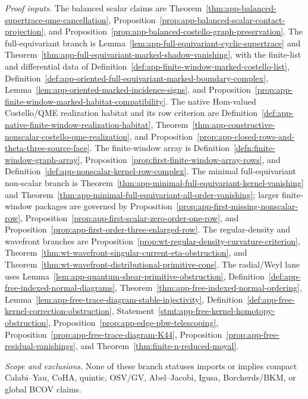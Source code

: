 \begin{stmt}
  \emph{Proof inputs.}
  The balanced scalar claims are
  Theorem~\ref{thm:app-balanced-supertrace-qme-cancellation},
  Proposition~\ref{prop:app-balanced-scalar-contact-projection}, and
  Proposition~\ref{prop:app-balanced-costello-graph-preservation}.  The
  full-equivariant branch is
  Lemma~\ref{lem:app-full-equivariant-cyclic-supertrace} and
  Theorem~\ref{thm:app-full-equivariant-marked-shadow-vanishing}, with
  the finite-list and differential data of
  Definition~\ref{def:app-finite-window-marked-costello-list},
  Definition~\ref{def:app-oriented-full-equivariant-marked-boundary-complex},
  Lemma~\ref{lem:app-oriented-marked-incidence-signs}, and
  Proposition~\ref{prop:app-finite-window-marked-habitat-compatibility}.
  The native Hom-valued Costello/QME realization habitat and its row
  criterion are
  Definition~\ref{def:app-native-finite-window-realization-habitat},
  Theorem~\ref{thm:app-constructive-nonscalar-costello-qme-realization},
  and Proposition~\ref{prop:app-closed-rows-and-theta-three-source-face}.
  The finite-window array is
  Definition~\ref{defn:finite-window-graph-array},
  Proposition~\ref{prop:first-finite-window-array-rows}, and
  Definition~\ref{def:app-nonscalar-kernel-row-complex}.  The minimal
  full-equivariant non-scalar branch is
  Theorem~\ref{thm:app-minimal-full-equivariant-kernel-vanishing} and
  Theorem~\ref{thm:app-minimal-full-equivariant-all-order-vanishing};
  larger finite-window packages are governed by
  Proposition~\ref{prop:app-first-missing-nonscalar-row},
  Proposition~\ref{prop:app-first-scalar-zero-order-one-row}, and
  Proposition~\ref{prop:app-first-order-three-enlarged-row}.  The
  regular-density and wavefront branches are
  Proposition~\ref{prop:wt-regular-density-curvature-criterion},
  Theorem~\ref{thm:wt-wavefront-singular-current-eta-obstruction}, and
  Theorem~\ref{thm:wt-wavefront-distributional-primitive-cone}.  The
  radial/Weyl lane uses
  Lemma~\ref{lem:app-quantum-shear-primitive-obstruction},
  Definition~\ref{def:app-free-indexed-normal-diagrams},
  Theorem~\ref{thm:app-free-indexed-normal-ordering},
  Lemma~\ref{lem:app-free-trace-diagram-stable-injectivity},
  Definition~\ref{def:app-free-kernel-correction-obstruction},
  Statement~\ref{stmt:app-free-kernel-homotopy-obstruction},
  Proposition~\ref{prop:app-edge-pbw-telescoping},
  Proposition~\ref{prop:app-free-trace-diagram-K44},
  Proposition~\ref{prop:app-free-residual-vanishings}, and
  Theorem~\ref{thm:finite-n-reduced-moyal}.

  \emph{Scope and exclusions.} None of these branch statuses imports or
  implies compact Calabi--Yau, CoHA, quintic, OSV/GV, Abel--Jacobi,
  Igusa, Borcherds/BKM, or global BCOV claims.
\end{stmt}

